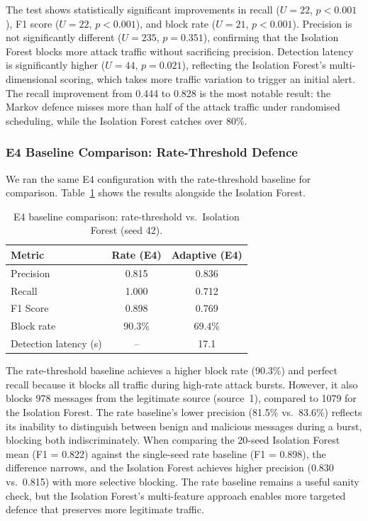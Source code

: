 The test shows statistically significant improvements in recall ($U = 22$, $p < 0.001$), F1 score ($U = 22$, $p < 0.001$), and block rate ($U = 21$, $p < 0.001$).
Precision is not significantly different ($U = 235$, $p = 0.351$), confirming that the Isolation Forest blocks more attack traffic without sacrificing precision.
Detection latency is significantly higher ($U = 44$, $p = 0.021$), reflecting the Isolation Forest's multi-dimensional scoring, which takes more traffic variation to trigger an initial alert.
The recall improvement from 0.444 to 0.828 is the most notable result: the Markov defence misses more than half of the attack traffic under randomised scheduling, while the Isolation Forest catches over 80\%.

\subsubsection{E4 Baseline Comparison: Rate-Threshold Defence}

We ran the same E4 configuration with the rate-threshold baseline for comparison.
Table~\ref{tab:e4_baseline} shows the results alongside the Isolation Forest.

\begin{table}[t]
\centering
\caption{E4 baseline comparison: rate-threshold vs.\ Isolation Forest (seed 42).}
\label{tab:e4_baseline}
\renewcommand{\arraystretch}{1.15}
\begin{tabular}{lcc}
\toprule
\textbf{Metric} & \textbf{Rate (E4)} & \textbf{Adaptive (E4)} \\
\midrule
Precision & 0.815 & 0.836 \\
Recall & 1.000 & 0.712 \\
F1 Score & 0.898 & 0.769 \\
Block rate & 90.3\% & 69.4\% \\
Detection latency (s) & -- & 17.1 \\
\bottomrule
\end{tabular}
\end{table}

The rate-threshold baseline achieves a higher block rate (90.3\%) and perfect recall because it blocks all traffic during high-rate attack bursts.
However, it also blocks 978 messages from the legitimate source (source~1), compared to 1079 for the Isolation Forest.
The rate baseline's lower precision (81.5\% vs.\ 83.6\%) reflects its inability to distinguish between benign and malicious messages during a burst, blocking both indiscriminately.
When comparing the 20-seed Isolation Forest mean (F1 = 0.822) against the single-seed rate baseline (F1 = 0.898), the difference narrows, and the Isolation Forest achieves higher precision (0.830 vs.\ 0.815) with more selective blocking.
The rate baseline remains a useful sanity check, but the Isolation Forest's multi-feature approach enables more targeted defence that preserves more legitimate traffic.

